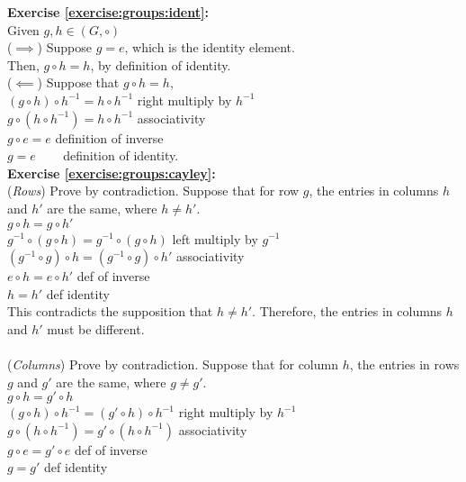 \noindent\textbf{Exercise \ref{exercise:groups:ident}:}
\\
Given $g, h \in (G, \circ)$\\
($\implies$) Suppose $g = e$, which is the identity element.\\
Then, $g \circ h = h$, by definition of identity.\\
($\impliedby$) Suppose that $g \circ h = h$,\\
$(g \circ h) \circ h^{-1} = h \circ h^{-1}$ \quad right multiply by $h^{-1}$\\
$g \circ (h \circ h^{-1}) = h \circ h^{-1}$ \quad associativity\\
$g \circ e = e$ \quad definition of inverse \\
$g = e$ \quad ~~~ definition of identity.
\\

\noindent\textbf{Exercise \ref{exercise:groups:cayley}:}
\\
(\emph{Rows})  Prove by contradiction. Suppose that for row $g$,  the entries in columns $h$ and $h'$ are the same, where $h \neq h'$.\\

\noindent
$g \circ h = g \circ h'$\\
$g^{-1} \circ (g \circ h) = g^{-1} \circ (g \circ h)$ \quad left multiply by $g^{-1}$\\
$(g^{-1} \circ g) \circ h = (g^{-1} \circ g) \circ h'$ \quad associativity\\
$e \circ h = e \circ h'$ \quad def of inverse\\
$h = h'$ \quad def identity\\

\noindent
This contradicts the supposition that $h \neq h'$.  Therefore, the entries in columns $h$ and $h'$ must be different.\\
\\
(\emph{Columns}) Prove by contradiction. Suppose that for column $h$,  the entries in rows $g$ and $g'$ are the same, where $g \neq g'$.\\

\noindent
$g \circ h = g' \circ h$\\
$(g \circ h) \circ h^{-1} = (g' \circ h) \circ h^{-1}$ \quad right multiply by $h^{-1}$\\
$g \circ (h \circ h^{-1}) = g' \circ (h \circ h^{-1})$ \quad associativity\\
$g \circ e = g' \circ e$ \quad def of inverse\\
$g = g'$ \quad def identity\\


